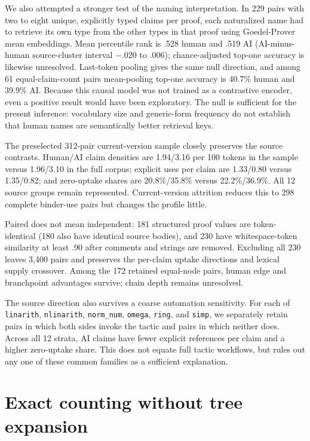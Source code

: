 \documentclass[10pt]{article}
\newcommand{\code}[1]{\texttt{#1}}
\begin{document}
We also attempted a stronger test of the naming interpretation.  In 229 pairs with two to eight
unique, explicitly typed claims per proof, each naturalized name had to retrieve its own type from
the other types in that proof using Goedel-Prover mean embeddings.  Mean percentile rank is .528
human and .519 AI (AI-minus-human source-cluster interval $-.020$ to $.006$); chance-adjusted top-one
accuracy is likewise unresolved.  Last-token pooling gives the same null direction, and among 61
equal-claim-count pairs mean-pooling top-one accuracy is 40.7\% human and 39.9\% AI.  Because this causal
model was not trained as a contrastive encoder, even a positive result would have been exploratory.
The null is sufficient for the present inference: vocabulary size and generic-form frequency do not
establish that human names are semantically better retrieval keys.

The preselected 312-pair current-version sample closely preserves the source contrasts.  Human/AI claim
densities are 1.94/3.16 per 100 tokens in the sample versus 1.96/3.10 in the full corpus; explicit
uses per claim are 1.33/0.80 versus 1.35/0.82; and zero-uptake shares are 20.8\%/35.8\% versus
22.2\%/36.9\%.  All 12 source groups remain represented.  Current-version attrition reduces this to 298
complete binder-use pairs but changes the profile little.

Paired does not mean independent: 181 structured proof values are token-identical (180 also have
identical source bodies), and 230 have whitespace-token similarity at least .90 after comments and
strings are removed.  Excluding all 230 leaves 3,400 pairs and preserves the per-claim uptake
directions and lexical supply crossover.  Among the 172 retained equal-node pairs, human edge and branchpoint
advantages survive; chain depth remains unresolved.

The source direction also survives a coarse automation sensitivity.  For each of \code{linarith},
\code{nlinarith}, \code{norm\_num}, \code{omega}, \code{ring}, and \code{simp}, we separately retain
pairs in which both sides invoke the tactic and pairs in which neither does.  Across all 12 strata,
AI claims have fewer explicit references per claim and a higher zero-uptake share.  This does not
equate full tactic workflows, but rules out any one of these common families as a sufficient
explanation.

\section{Exact counting without tree expansion}
\end{document}
